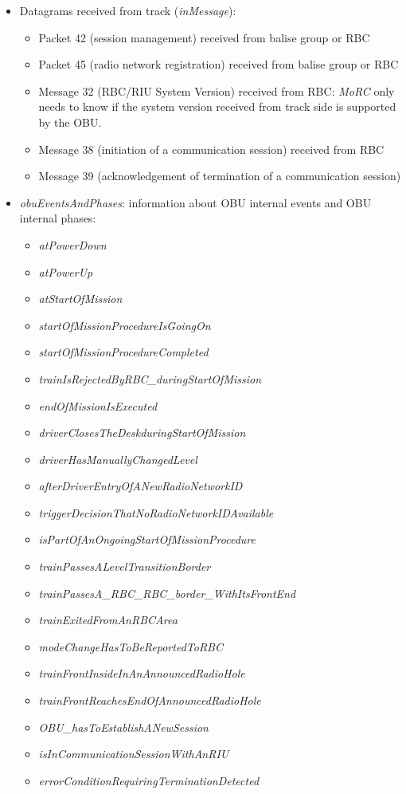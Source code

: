 \begin{itemize}

 \item Datagrams received from track (\textit{inMessage}):
 \begin{itemize}
  \item Packet 42 (session management) received from balise group or RBC
  \item Packet 45 (radio network registration) received from balise group or RBC
  \item Message 32 (RBC/RIU System Version) received from RBC: \textit{MoRC} only needs to know if the system version received from track side is supported by the OBU.
  \item Message 38 (initiation of a communication session) received from RBC
  \item Message 39 (acknowledgement of termination of a communication session)
 \end{itemize}

 \item \textit{obuEventsAndPhases}: information about OBU internal events and OBU internal phases:

  \begin{itemize}
   \item \textit{atPowerDown}
   \item \textit{atPowerUp}
   \item \textit{atStartOfMission}
   \item \textit{startOfMissionProcedureIsGoingOn}
   \item \textit{startOfMissionProcedureCompleted}
   \item \textit{trainIsRejectedByRBC\_duringStartOfMission}
   \item \textit{endOfMissionIsExecuted}
   \item \textit{driverClosesTheDeskduringStartOfMission}
   \item \textit{driverHasManuallyChangedLevel}
   \item \textit{afterDriverEntryOfANewRadioNetworkID}
   \item \textit{triggerDecisionThatNoRadioNetworkIDAvailable}
   \item \textit{isPartOfAnOngoingStartOfMissionProcedure}
   \item \textit{trainPassesALevelTransitionBorder}
   \item \textit{trainPassesA\_RBC\_RBC\_border\_WithItsFrontEnd}
   \item \textit{trainExitedFromAnRBCArea}
   \item \textit{modeChangeHasToBeReportedToRBC}
   \item \textit{trainFrontInsideInAnAnnouncedRadioHole}
   \item \textit{trainFrontReachesEndOfAnnouncedRadioHole}
   \item \textit{OBU\_hasToEstablishANewSession}
   \item \textit{isInCommunicationSessionWithAnRIU}
   \item \textit{errorConditionRequiringTerminationDetected}
  \end{itemize}


\end{itemize}
